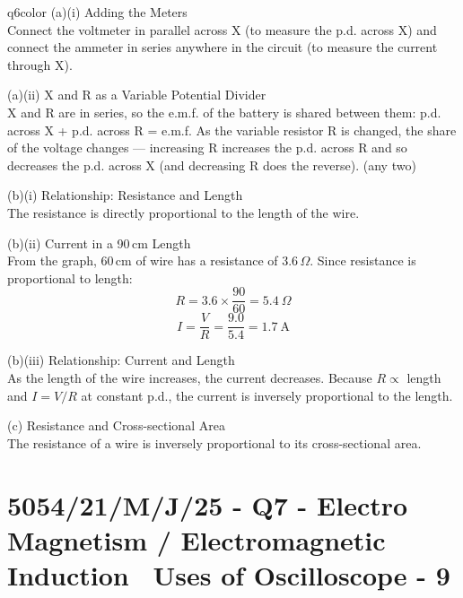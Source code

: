 \documentclass[11pt,a4paper]{article}
\newcommand{\examq}[4]{\section[#1 - Q#2]{#1 - Q#2 - #3 - #4}}
\begin{document}
\begin{ansbox}{q6color}
(a)(i) Adding the Meters\\[4pt]
Connect the voltmeter in parallel across X (to measure the p.d. across X) and connect the ammeter in series anywhere in the circuit (to measure the current through X).

\vspace{4pt}
(a)(ii) X and R as a Variable Potential Divider\\[4pt]
X and R are in series, so the e.m.f. of the battery is shared between them: p.d. across X + p.d. across R = e.m.f. As the variable resistor R is changed, the share of the voltage changes --- increasing R increases the p.d. across R and so decreases the p.d. across X (and decreasing R does the reverse). (any two)

\vspace{4pt}
(b)(i) Relationship: Resistance and Length\\[4pt]
The resistance is directly proportional to the length of the wire.

\vspace{4pt}
(b)(ii) Current in a 90\,cm Length\\[4pt]
From the graph, 60\,cm of wire has a resistance of 3.6\,$\Omega$. Since resistance is proportional to length:
\[ R = 3.6 \times \frac{90}{60} = 5.4\ \Omega \]
\[ I = \frac{V}{R} = \frac{9.0}{5.4} = \boxed{1.7\ \text{A}} \]

\vspace{4pt}
(b)(iii) Relationship: Current and Length\\[4pt]
As the length of the wire increases, the current decreases. Because $R \propto$ length and $I = V/R$ at constant p.d., the current is inversely proportional to the length.

\vspace{4pt}
(c) Resistance and Cross-sectional Area\\[4pt]
The resistance of a wire is inversely proportional to its cross-sectional area.
\end{ansbox}

\examq{5054/21/M/J/25}{7}{Electro Magnetism / Electromagnetic Induction \textperiodcentered\ Uses of Oscilloscope}{9}
\end{document}
